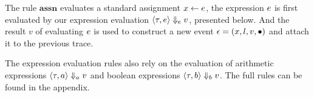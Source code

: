 The rule $\textbf{assn}$ evaluates a standard assignment $\mathrel{ x \leftarrow e }$, the expression $e$ is first evaluated by our expression evaluation $\langle \mathtt{\tau}, e \rangle \Downarrow_e v $, presented below. And the result $v$ of evaluating $e$ is used to construct a new event $\mathtt{\epsilon} = (x, l, v,\bullet)$ and attach it to the previous trace. 
The expression evaluation rules also rely on the evaluation of arithmetic expressions $\langle \mathtt{\tau},a \rangle \Downarrow_a v $ and boolean expressions $\langle \mathtt{\tau}, b \rangle \Downarrow_b v $. The full rules can be found in the appendix.
